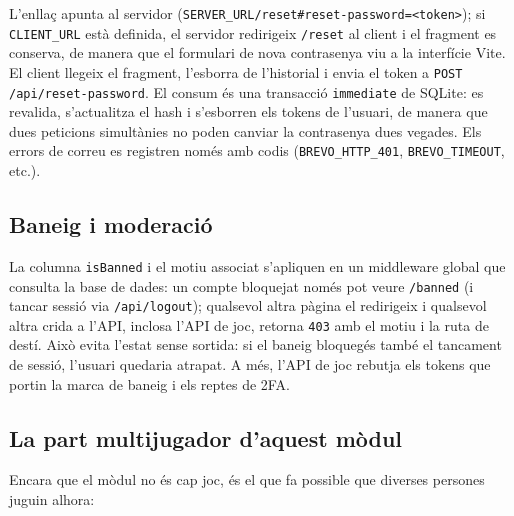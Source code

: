 \documentclass[11pt,a4paper]{article}
\begin{document}
L'enllaç apunta al servidor (\texttt{SERVER\_URL/reset\#reset-password=<token>}); si
\texttt{CLIENT\_URL} està definida, el servidor redirigeix \texttt{/reset} al client i
el fragment es conserva, de manera que el formulari de nova contrasenya viu a la
interfície Vite. El client llegeix el fragment, l'esborra de l'historial i envia el
token a \texttt{POST /api/reset-password}. El consum és una transacció
\texttt{immediate} de SQLite: es revalida, s'actualitza el hash i s'esborren els tokens
de l'usuari, de manera que dues peticions simultànies no poden canviar la contrasenya
dues vegades. Els errors de correu es registren només amb codis
(\texttt{BREVO\_HTTP\_401}, \texttt{BREVO\_TIMEOUT}, etc.).

\subsection{Baneig i moderació}

La columna \texttt{isBanned} i el motiu associat s'apliquen en un middleware global que
consulta la base de dades: un compte bloquejat només pot veure \texttt{/banned} (i
tancar sessió via \texttt{/api/logout}); qualsevol altra pàgina el redirigeix i
qualsevol altra crida a l'API, inclosa l'API de joc, retorna \texttt{403} amb el motiu
i la ruta de destí. Això evita l'estat sense sortida: si el baneig bloquegés també el
tancament de sessió, l'usuari quedaria atrapat. A més, l'API de joc rebutja els tokens
que portin la marca de baneig i els reptes de 2FA.

\subsection{La part multijugador d'aquest mòdul}

Encara que el mòdul no és cap joc, és el que fa possible que diverses persones juguin
alhora:
\end{document}

